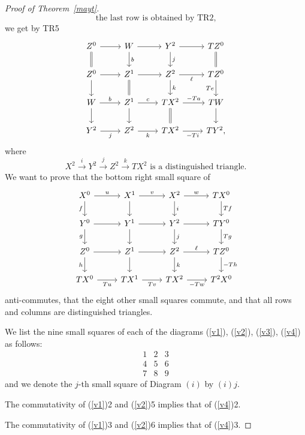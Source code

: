 \documentclass[12pt]{article}%
\theoremstyle{remark}
\theoremstyle{definition}
\newcommand{\xr}{\xrightarrow}
\begin{document}
\begin{proof}[Proof of Theorem~\ref{mayt}]
%
\begin{equation}\label{r3}
\text{the last row is obtained by TR2,} 
\end{equation}
%
we get by TR5 
%
\begin{equation}\label{v3}
\begin{tikzcd}
Z^0\ar{r}\ar[equal]{d}&W\ar{d}{b}\ar{r}&Y^2\ar{d}{j}\ar{r}&TZ^0\ar[equal]{d}\\
Z^0\ar{d}\ar{r}&Z^1\ar{r}\ar[equal]{d}&Z^2\ar{d}{k}\ar{r}[swap]{\ell}&TZ^0\ar{d}[swap]{Te}\\
W\ar{d}\ar{r}{b}&Z^1\ar{d}\ar{r}{c}&TX^2\ar{r}{-Ta}\ar[equal]{d}&TW\ar{d}\\
Y^2\ar{r}[swap]{j}&Z^2\ar{r}[swap]{k}&TX^2\ar{r}[swap]{-Ti}&TY^2,
\end{tikzcd}
\end{equation}
%
where 
%
\begin{equation}\label{c3}
X^2\xr iY^2\xr jZ^2\xr kTX^2\text{ is a distinguished triangle.} 
\end{equation}
%
We want to prove that the bottom right small square of 
%
\begin{equation}\label{v4}
\begin{tikzcd}
X^0\ar{r}{u}\ar{d}[swap]{f}&X^1\ar{d}\ar{r}{v}&X^2\ar{d}{i}\ar{r}{w}&TX^0\ar{d}{Tf}\\ 
Y^0\ar{r}\ar{d}[swap]{g}&Y^1\ar{d}\ar{r}&Y^2\ar{d}{j}\ar{r}&TY^0\ar{d}{Tg}\\ 
Z^0\ar{r}\ar{d}[swap]{h}&Z^1\ar{d}\ar{r}&Z^2\ar{d}{k}\ar{r}{\ell}&TZ^0\ar{d}{-Th}\\ 
TX^0\ar{r}[swap]{Tu}&TX^1\ar{r}[swap]{Tv}&TX^2\ar{r}[swap]{-Tw}&T^2X^0
\end{tikzcd}
\end{equation}
%
anti-commutes, that the eight other small squares commute, and that all rows and columns are distinguished triangles.

We list the nine small squares of each of the diagrams (\ref{v1}), (\ref{v2}), (\ref{v3}), (\ref{v4}) as follows:
$$
\begin{matrix}1&2&3\\ 4&5&6\\ 7&8&9
\end{matrix}
$$ 
and we denote the $j$-th small square of Diagram $(i)$ by $(i)j$. 

The commutativity of (\ref{v1})2 and (\ref{v2})5 implies that of (\ref{v4})2. 

The commutativity of (\ref{v1})3 and (\ref{v2})6 implies that of (\ref{v4})3.


\end{proof}
\end{document}
